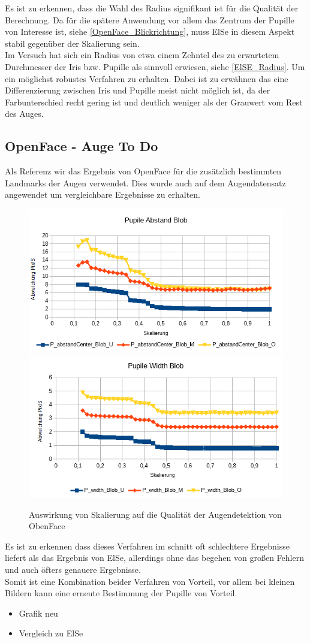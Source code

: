 Es ist zu erkennen, dass die Wahl des Radius signifikant ist für die Qualität der Berechnung. Da für die spätere Anwendung vor allem das Zentrum der Pupille von Interesse ist, siehe \autoref{OpenFace_Blickrichtung}, muss ElSe in diesem Aspekt stabil gegenüber der Skalierung sein.\\
Im Versuch hat sich ein Radius von etwa einem Zehntel des zu erwartetem Durchmesser der Iris bzw. Pupille als sinnvoll erwiesen, siehe \autoref{ElSE_Radius}. Um ein möglichst robustes Verfahren zu erhalten.
Dabei ist zu erwähnen das eine Differenzierung zwischen Iris und Pupille meist nicht möglich ist, da der Farbunterschied recht gering ist und deutlich weniger als der Grauwert vom Rest des Auges.\\
\subsection{OpenFace - Auge To Do}
Als Referenz wir das Ergebnis von OpenFace für die zusätzlich bestimmten Landmarks der Augen verwendet. Dies wurde auch auf dem Augendatensatz \cite{database_Eye} angewendet um vergleichbare Ergebnisse zu erhalten.
\begin{figure}
	\centering
	\includegraphics[width=0.45\linewidth]{Eye_Img/OpenFace_Pupile_Abstand}
	\includegraphics[width=0.45\linewidth]{Eye_Img/OpenFace_Pupile_Width}
	\caption{Auswirkung von Skalierung auf die Qualität der Augendetektion von ObenFace}
	\label{OpenFace_Eye}
\end{figure}
Es ist zu erkennen dass dieses Verfahren im schnitt oft schlechtere Ergebnisse liefert als das Ergebnis von ElSe, allerdings ohne das begehen von großen Fehlern und auch öfters genauere Ergebnisse.\\
Somit ist eine Kombination beider Verfahren von Vorteil, vor allem bei kleinen Bildern kann eine erneute Bestimmung der Pupille von Vorteil.
\begin{itemize}
	\item Grafik neu
	\item Vergleich zu ElSe
\end{itemize}

